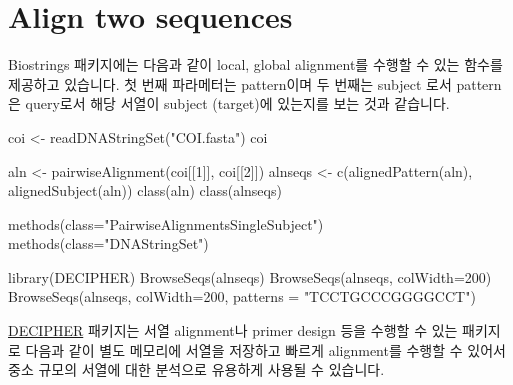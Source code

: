 \documentclass[
]{book}
\newenvironment{Shaded}{\begin{snugshade}}{\end{snugshade}}
\newcommand{\AttributeTok}[1]{\textcolor[rgb]{0.77,0.63,0.00}{#1}}
\newcommand{\DecValTok}[1]{\textcolor[rgb]{0.00,0.00,0.81}{#1}}
\newcommand{\FunctionTok}[1]{\textcolor[rgb]{0.00,0.00,0.00}{#1}}
\newcommand{\NormalTok}[1]{#1}
\newcommand{\OtherTok}[1]{\textcolor[rgb]{0.56,0.35,0.01}{#1}}
\newcommand{\StringTok}[1]{\textcolor[rgb]{0.31,0.60,0.02}{#1}}
\begin{document}
\hypertarget{align-two-sequences-1}{%
\section{Align two sequences}\label{align-two-sequences-1}}

Biostrings 패키지에는 다음과 같이 local, global alignment를 수행할 수 있는 함수를 제공하고 있습니다. 첫 번째 파라메터는 pattern이며 두 번째는 subject 로서 pattern은 query로서 해당 서열이 subject (target)에 있는지를 보는 것과 같습니다.

\begin{Shaded}
\begin{Highlighting}[]
\NormalTok{coi }\OtherTok{\textless{}{-}} \FunctionTok{readDNAStringSet}\NormalTok{(}\StringTok{"COI.fasta"}\NormalTok{)}
\NormalTok{coi}

\NormalTok{aln }\OtherTok{\textless{}{-}} \FunctionTok{pairwiseAlignment}\NormalTok{(coi[[}\DecValTok{1}\NormalTok{]], coi[[}\DecValTok{2}\NormalTok{]])}
\NormalTok{alnseqs }\OtherTok{\textless{}{-}} \FunctionTok{c}\NormalTok{(}\FunctionTok{alignedPattern}\NormalTok{(aln), }\FunctionTok{alignedSubject}\NormalTok{(aln))}
\FunctionTok{class}\NormalTok{(aln)}
\FunctionTok{class}\NormalTok{(alnseqs)}

\FunctionTok{methods}\NormalTok{(}\AttributeTok{class=}\StringTok{"PairwiseAlignmentsSingleSubject"}\NormalTok{)}
\FunctionTok{methods}\NormalTok{(}\AttributeTok{class=}\StringTok{"DNAStringSet"}\NormalTok{)}

\FunctionTok{library}\NormalTok{(DECIPHER)}
\FunctionTok{BrowseSeqs}\NormalTok{(alnseqs)}
\FunctionTok{BrowseSeqs}\NormalTok{(alnseqs, }\AttributeTok{colWidth=}\DecValTok{200}\NormalTok{)}
\FunctionTok{BrowseSeqs}\NormalTok{(alnseqs, }\AttributeTok{colWidth=}\DecValTok{200}\NormalTok{, }\AttributeTok{patterns =} \StringTok{"TCCTGCCCGGGGCCT"}\NormalTok{)}
\end{Highlighting}
\end{Shaded}

\href{https://www.bioconductor.org/packages/release/bioc/html/DECIPHER.html}{DECIPHER} 패키지는 서열 alignment나 primer design 등을 수행할 수 있는 패키지로 다음과 같이 별도 메모리에 서열을 저장하고 빠르게 alignment를 수행할 수 있어서 중소 규모의 서열에 대한 분석으로 유용하게 사용될 수 있습니다.
\end{document}
